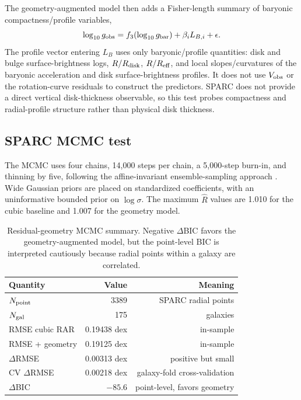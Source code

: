 ﻿\documentclass[twocolumn]{aastex631}
\begin{document}
The geometry-augmented model then adds a Fisher-length summary of baryonic compactness/profile variables,
\begin{equation}
\log_{10}g_{\rm obs}=f_3(\log_{10}g_{\rm bar})+
\beta_i L_{B,i}+\epsilon.
\end{equation}
The profile vector entering $L_B$ uses only baryonic/profile quantities: disk and bulge surface-brightness logs, $R/R_{\rm disk}$, $R/R_{\rm eff}$, and local slopes/curvatures of the baryonic acceleration and disk surface-brightness profiles.  It does not use $V_{\rm obs}$ or the rotation-curve residuals to construct the predictors.  SPARC does not provide a direct vertical disk-thickness observable, so this test probes compactness and radial-profile structure rather than physical disk thickness.

\subsection{SPARC MCMC test}
The MCMC uses four chains, 14,000 steps per chain, a 5,000-step burn-in, and thinning by five, following the affine-invariant ensemble-sampling approach \citep{GoodmanWeare2010,ForemanMackey2013}.  Wide Gaussian priors are placed on standardized coefficients, with an uninformative bounded prior on $\log\sigma$.  The maximum $\hat R$ values are 1.010 for the cubic baseline and 1.007 for the geometry model.

\begin{table}[!htbp]
\centering
\scriptsize
\begin{tabular}{lrr}
\toprule
Quantity & Value & Meaning\\
\midrule
$N_{\rm point}$ & 3389 & SPARC radial points\\
$N_{\rm gal}$ & 175 & galaxies\\
RMSE cubic RAR & 0.19438 dex & in-sample\\
RMSE + geometry & 0.19125 dex & in-sample\\
$\Delta$RMSE & 0.00313 dex & positive but small\\
CV $\Delta$RMSE & 0.00218 dex & galaxy-fold cross-validation\\
$\Delta$BIC & $-85.6$ & point-level, favors geometry\\
\bottomrule
\end{tabular}
\caption{Residual-geometry MCMC summary.  Negative $\Delta$BIC favors the geometry-augmented model, but the point-level BIC is interpreted cautiously because radial points within a galaxy are correlated.}
\end{table}
\end{document}
